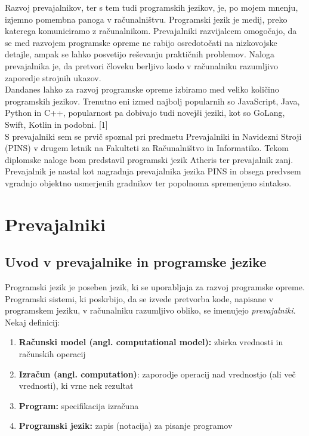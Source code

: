 \documentclass[a4paper, 12pt]{book}
\begin{document}
Razvoj prevajalnikov, ter s tem tudi programskih jezikov, je, po mojem mnenju, izjemno pomembna panoga v računalništvu. Programski jezik je medij, preko katerega komuniciramo z računalnikom. Prevajalniki razvijalcem omogočajo, da se med razvojem programske opreme ne rabijo osredotočati na nizkovojske detajle, ampak se lahko posvetijo reševanju praktičnih problemov. Naloga prevajalnika je, da pretvori človeku berljivo kodo v računalniku razumljivo zaporedje strojnih ukazov. \\
\indent Dandanes lahko za razvoj programske opreme izbiramo med veliko količino programskih jezikov. Trenutno eni izmed najbolj popularnih so JavaScript, Java, Python in C++, popularnost pa dobivajo tudi novejši jeziki, kot so GoLang, Swift, Kotlin in podobni. [1] \\
\indent S prevajalniki sem se prvič spoznal pri predmetu Prevajalniki in Navidezni Stroji (PINS) v drugem letnik na Fakulteti za Računalništvo in Informatiko. Tekom diplomske naloge bom predstavil programski jezik Atheris ter prevajalnik zanj. Prevajalnik je nastal kot nagradnja prevajalnika jezika PINS in obsega predvsem vgradnjo objektno usmerjenih gradnikov ter popolnoma spremenjeno sintakso.

\chapter{Prevajalniki}
\label{ch0}

\section{Uvod v prevajalnike in programske jezike}

Programski jezik je poseben jezik, ki se uporabljaja za razvoj programske opreme. Programski sistemi, ki poskrbijo, da se izvede pretvorba kode, napisane v programskem jeziku, v računalniku razumljivo obliko, se imenujejo \textit{prevajalniki}. \\
Nekaj definicij:
\begin{enumerate}  
	\item \textbf{Računski model (angl. computational model):} zbirka vrednosti in računskih operacij 
	\item \textbf{Izračun (angl. computation)}: zaporodje operacij nad vrednostjo (ali več vrednosti), ki vrne nek rezultat
	\item \textbf{Program:} specifikacija izračuna
	\item \textbf{Programski jezik:} zapis (notacija) za pisanje programov
\end{enumerate}
\cite{computationalModel}
\end{document}
